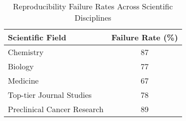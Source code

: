 \documentclass{article}
\begin{document}
\begin{table}[h]
    \centering
    \caption{Reproducibility Failure Rates Across Scientific Disciplines}
    \begin{tabular}{|l|c|}
        \hline
        \textbf{Scientific Field}   & \textbf{Failure Rate (\%)} \\
        \hline
        Chemistry                   & 87                         \\
        Biology                     & 77                         \\
        Medicine                    & 67                         \\
        Top-tier Journal Studies    & 78                         \\
        Preclinical Cancer Research & 89                         \\
        \hline
    \end{tabular}
    \label{tab:reproducibility}
\end{table}



\renewcommand{\arraystretch}{1.5}
\end{document}
